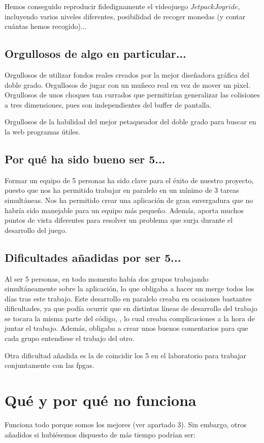 \documentclass[11pt, a4paper, spanish, openright, twoside]{book}
\begin{document}
Hemos conseguido reproducir fidedignamente el videojuego $Jetpack Joyride$, incluyendo varios niveles diferentes, posibilidad de recoger monedas (y contar cuántas hemos recogido)...

\subsection{Orgullosos de algo en particular...}

Orgullosos de utilizar fondos reales creados por la mejor diseñadora gráfica del doble grado. Orgullosos de jugar con un muñeco real en vez de mover un pixel. Orgullosos de unos choques tan
 currados que permitirían generalizar las colisiones a tres dimensiones, pues son independientes del buffer de pantalla. 

Orgullosos de la habilidad del mejor petaqueador del doble grado para buscar en la web programas útiles. 

\subsection{Por qué ha sido bueno ser 5...}
Formar un equipo de 5 personas ha sido clave para el éxito de nuestro proyecto, puesto que nos ha permitido trabajar en paralelo en un mínimo de 3 tareas simultáneas. Nos ha 
permitido crear una aplicación de gran envergadura que no habría sido manejable para un equipo más pequeño.
Además, aporta muchos puntos de vista diferentes para resolver un problema que surja durante el desarrollo del juego.


\subsection{Dificultades añadidas por ser 5...}

Al ser 5 personas, en todo momento había dos grupos trabajando simultáneamente sobre la aplicación, lo que obligaba a hacer un merge todos los días tras este trabajo. Este desarrollo en paralelo
creaba en ocasiones bastantes dificultades, ya que podía ocurrir que en distintas líneas de desarrollo del trabajo se tocara la misma parte del código, 
, lo cual creaba complicaciones a la hora de juntar el trabajo. Además, 
obligaba a crear unos buenos comentarios para que cada grupo entendiese el trabajo del otro. 

Otra dificultad añadida es la de coincidir los 5  en el laboratorio para trabajar conjuntamente con las fpgas.

\section{Qué y por qué no funciona}
Funciona todo porque somos los mejores (ver apartado 3). Sin embargo, otros añadidos si hubiésemos dispuesto de más tiempo podrían ser:
	
\end{document}
